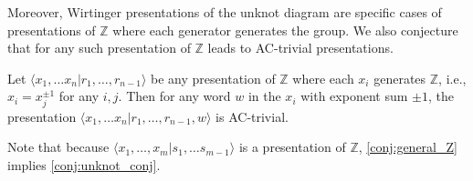 Moreover, Wirtinger presentations of the unknot diagram are specific cases of presentations of $\mathbb{Z}$ where each generator generates the group. We also conjecture that for any such presentation of $\mathbb{Z}$ leads to AC-trivial presentations. 
\begin{conjecture}
\label{conj:general_Z}
    Let $\langle x_1,\ldots x_n | r_1,\ldots, r_{n-1}\rangle$ be any presentation of $\mathbb{Z}$ where each $x_i$ generates $\mathbb{Z}$, i.e., $x_i=x_j^{\pm 1}$ for any $i,j$. Then for any word $w$ in the $x_i$ with exponent sum $\pm 1$, the presentation $\langle x_1,\ldots x_n | r_1,\ldots, r_{n-1}, w\rangle$ is AC-trivial. 
\end{conjecture}
Note that because $\langle x_1,\ldots, x_m| s_1,\ldots s_{m-1}\rangle$ is a presentation of $\mathbb{Z}$, \cref{conj:general_Z} implies \cref{conj:unknot_conj}. 



